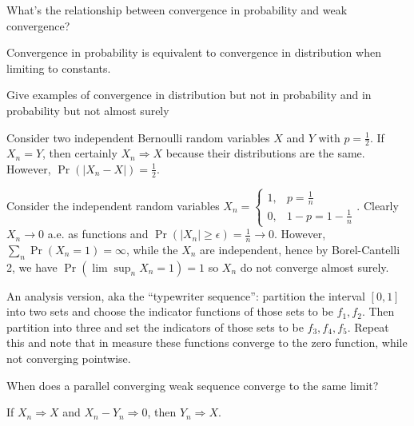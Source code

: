 \documentclass[avery5388,grid,frame]{flashcards}
\begin{document}
\begin{flashcard}
    {What's the relationship between convergence in probability and weak convergence?}
    \begin{remark}

    \end{remark}

    \begin{remark}
        Convergence in probability is equivalent to convergence in distribution when limiting to constants.
    \end{remark}
\end{flashcard}


\begin{flashcard}
    {Give examples of convergence in distribution but not in probability and in probability but not almost surely}
    \begin{example}
        Consider two independent Bernoulli random variables $X$ and $Y$ with $p=\frac 1 2$. If $X_n = Y$, then certainly $X_n \Rightarrow X$ because their distributions are the same. However, $\Pr(|X_n - X|) = \frac 1 2$.
    \end{example}

    \begin{example}
        Consider the independent random variables $X_n =
        \begin{cases}
            1, & p=\frac 1 n\\
            0, & 1-p = 1 - \frac 1 n
        \end{cases}$. Clearly $X_n \rightarrow 0$ a.e. as functions and $\Pr(|X_n| \geq \epsilon) = \frac 1 n \rightarrow 0$. However, $\sum_n \Pr(X_n = 1) = \infty$, while the $X_n$ are independent, hence by Borel-Cantelli 2, we have $\Pr(\lim \sup_n X_n = 1) = 1$ so $X_n$ do not converge almost surely.
    \end{example}

    \begin{example}
        An analysis version, aka the ``typewriter sequence'': partition the interval $[0,1]$ into two sets and choose the indicator functions of those sets to be $f_1, f_2$. Then partition into three and set the indicators of those sets to be $f_3,f_4,f_5$. Repeat this and note that in measure these functions converge to the zero function, while not converging pointwise.
    \end{example}
\end{flashcard}


\begin{flashcard}
    {When does a parallel converging weak sequence converge to the same limit?}
    \begin{theorem}
        If $X_n \Rightarrow X$ and $X_n - Y_n \Rightarrow 0$, then $Y_n \Rightarrow X$.
    \end{theorem}
\end{flashcard}
\end{document}
